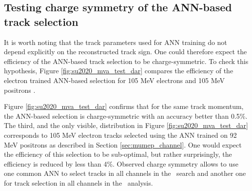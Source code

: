 \subsection{Testing charge symmetry of the ANN-based track selection}

It is worth noting that the track parameters used for ANN training  {\blue do not} depend explicitly
on the reconstructed track sign. One could therefore expect the efficiency of the ANN-based
track selection to be charge-symmetric. To check this hypothesis, Figure \ref{fig:su2020_mva_test_dar}
compares {\blue the} efficiency of the {\blue electron trained }ANN-based selection for 105 MeV electrons and 105 MeV positrons
.

Figure \ref{fig:su2020_mva_test_dar} confirms that for the same track momentum, the ANN-based selection
is charge-symmetric with an accuracy better than 0.5\%.
The third, and the only visible{\blue , distribution} in Figure \ref{fig:su2020_mva_test_dar}  corresponds to
 105 MeV electron tracks {\blue selected} using {\blue the} ANN trained on 92 MeV positrons as described in
Section \ref{sec:mumep_channel}. One  {\blue would} expect {\blue the} efficiency of this selection to be sub-optimal,
{\blue but} rather surprisingly, {\blue the} efficiency is reduced by less than 4\%.
Observed charge symmetry allows to use one common ANN to select tracks in all channels in {\blue the} \MuToEm\ search 
and another one \strike{-} for track selection in all channels in {\blue the} \MuToEp\ analysis.

